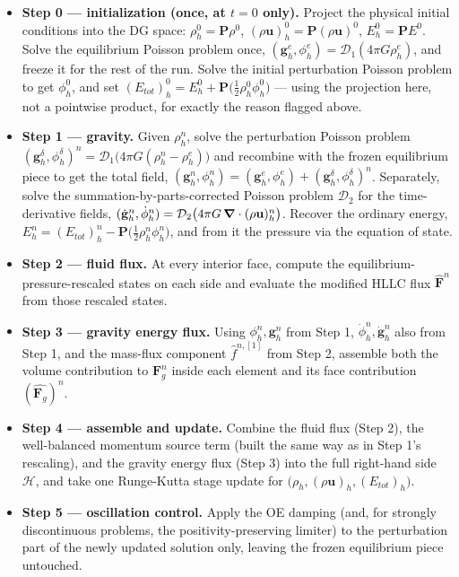 \begin{itemize}
	\item \textbf{Step 0 --- initialization (once, at $t=0$ only).} Project the physical initial conditions into the DG space: $\rho_h^0 = \mathbf{P}\rho^0$, $(\rho\mathbf{u})_h^0 = \mathbf{P}(\rho\mathbf{u})^0$, $E_h^0 = \mathbf{P}E^0$. Solve the equilibrium Poisson problem once, $(\mathbf{g}_h^e,\phi_h^e) = \mathcal{D}_1(4\pi G\rho_h^e)$, and freeze it for the rest of the run. Solve the initial perturbation Poisson problem to get $\phi_h^0$, and set $(E_{tot})_h^0 = E_h^0 + \mathbf{P}\big(\tfrac12\rho_h^0\phi_h^0\big)$ — using the projection here, not a pointwise product, for exactly the reason flagged above.
	\item \textbf{Step 1 --- gravity.} Given $\rho_h^n$, solve the perturbation Poisson problem $(\mathbf{g}_h^\delta, \phi_h^\delta)^n = \mathcal{D}_1\big(4\pi G(\rho_h^n - \rho_h^e)\big)$ and recombine with the frozen equilibrium piece to get the total field, $(\mathbf{g}_h^n,\phi_h^n) = (\mathbf{g}_h^e,\phi_h^e) + (\mathbf{g}_h^\delta,\phi_h^\delta)^n$. Separately, solve the summation-by-parts-corrected Poisson problem $\mathcal{D}_2$ for the time-derivative fields, $(\dot{\mathbf{g}}_h^n,\dot\phi_h^n) = \mathcal{D}_2\big(4\pi G\,\grad\cdot(\rho\mathbf{u})_h^n\big)$. Recover the ordinary energy, $E_h^n = (E_{tot})_h^n - \mathbf{P}\big(\tfrac12\rho_h^n\phi_h^n\big)$, and from it the pressure via the equation of state.
	\item \textbf{Step 2 --- fluid flux.} At every interior face, compute the equilibrium-pressure-rescaled states on each side and evaluate the modified HLLC flux $\widehat{\mathbf{F}}^n$ from those rescaled states.
	\item \textbf{Step 3 --- gravity energy flux.} Using $\phi_h^n,\mathbf{g}_h^n$ from Step 1, $\dot\phi_h^n,\dot{\mathbf{g}}_h^n$ also from Step 1, and the mass-flux component $\widehat{f}^{n,[1]}$ from Step 2, assemble both the volume contribution to $\mathbf{F}_g^n$ inside each element and its face contribution $(\widehat{\mathbf{F}_g})^n$.
	\item \textbf{Step 4 --- assemble and update.} Combine the fluid flux (Step 2), the well-balanced momentum source term (built the same way as in Step 1's rescaling), and the gravity energy flux (Step 3) into the full right-hand side $\mathcal{H}$, and take one Runge-Kutta stage update for $\big(\rho_h,(\rho\mathbf{u})_h,(E_{tot})_h\big)$.
	\item \textbf{Step 5 --- oscillation control.} Apply the OE damping (and, for strongly discontinuous problems, the positivity-preserving limiter) to the perturbation part of the newly updated solution only, leaving the frozen equilibrium piece untouched.
\end{itemize}

